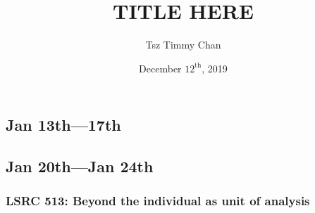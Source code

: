 \documentclass{LSRIarticle}
\title{TITLE HERE}	%
\author{Tsz Timmy Chan}	%
\date{December $12^{\text{th}}$, 2019}
\begin{document}



\subsection{Jan 13th---17th}	
	
	
\subsection{Jan 20th---Jan 24th}
	\subsubsection{LSRC 513: Beyond the individual as unit of analysis}
	







\end{document}
